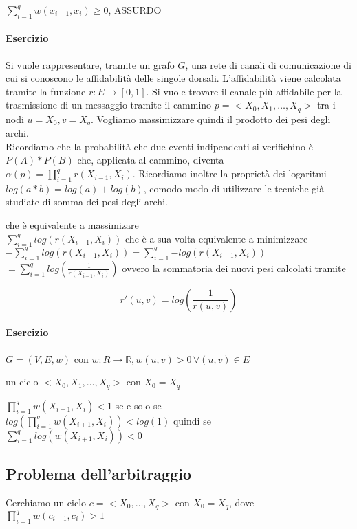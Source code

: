 $\sum_{i=1}^q{w(x_{i-1},x_i)} \geq 0$, ASSURDO


\paragraph{Esercizio}

Si vuole rappresentare, tramite un grafo $G$, una rete di canali di comunicazione di cui si conoscono le affidabilità delle singole dorsali. L'affidabilità viene calcolata tramite la funzione $r : E \rightarrow [0,1]$. Si vuole trovare il canale più affidabile per la trasmissione di un messaggio tramite il cammino $p = <X_0,X_1,\ldots,X_q>$ tra i nodi $u =X_0,v=X_q$. Vogliamo massimizzare quindi il prodotto dei pesi degli archi. \\
Ricordiamo che la probabilità che due eventi indipendenti si verifichino è $P(A) * P(B)$ che, applicata al cammino, diventa $\alpha(p) = \prod_{i=1}^{q}{r(X_{i-1},X_i)}$. Ricordiamo inoltre la proprietà dei logaritmi $log(a*b) = log(a) + log(b)$, comodo modo di utilizzare le tecniche già studiate di somma dei pesi degli archi.


che è equivalente a massimizare \\
$\sum_{i=1}^q{log(r(X_{i-1},X_i))}$
che è a sua volta equivalente a minimizzare \\
$-\sum_{i=1}^q{log(r(X_{i-1},X_i))} = \sum_{i=1}^q{-log(r(X_{i-1},X_i))}$ \\
$ = \sum_{i=1}^q{log(\frac{1}{r(X_{i-1},X_i)})}$ ovvero la sommatoria dei nuovi pesi calcolati tramite

\begin{equation}
r'(u,v) = log(\frac{1}{r(u,v)})
\end{equation}

\paragraph{Esercizio}

$G=(V,E,w)$ con $w: R \rightarrow \mathbb{R}, w(u,v) >0\,\forall (u,v) \in E$

un ciclo $<X_0,X_1,\ldots,X_q>$ con $X_0 = X_q$

$\prod_{i=1}^q{w(X_{i+1},X_i)} < 1$ se e solo se \\
$log(\prod_{i=1}^q{w(X_{i+1},X_i)}) < log(1)$ quindi se \\
$\sum_{i=1}^q{log(w(X_{i+1},X_i))} < 0$



\subsection{Problema dell'arbitraggio}
Cerchiamo un ciclo $c = <X_0,\ldots,X_q>$ con $X_0 = X_q$, dove $\prod_{i=1}^q{w(c_{i-1},c_i)} > 1$

